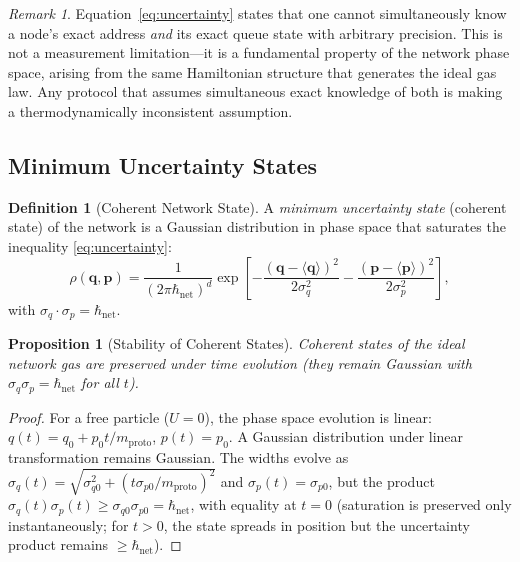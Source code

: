 \documentclass[11pt,twocolumn,a4paper]{article}
\newtheorem{proposition}[theorem]{Proposition}
\theoremstyle{definition}
\newtheorem{definition}[theorem]{Definition}
\theoremstyle{remark}
\newtheorem{remark}[theorem]{Remark}
\newcommand{\mpr}{m_{\mathrm{proto}}}
\newcommand{\hnet}{\hbar_{\mathrm{net}}}
\newcommand{\avg}[1]{\langle #1 \rangle}
\begin{document}
\begin{remark}
Equation~\eqref{eq:uncertainty} states that one cannot simultaneously know a
node's exact address \emph{and} its exact queue state with arbitrary precision.
This is not a measurement limitation---it is a fundamental property of the
network phase space, arising from the same Hamiltonian structure that
generates the ideal gas law.  Any protocol that assumes simultaneous exact
knowledge of both is making a thermodynamically inconsistent assumption.
\end{remark}

\subsection{Minimum Uncertainty States}\label{sec:min_uncertainty}

\begin{definition}[Coherent Network State]\label{def:coherent}
A \emph{minimum uncertainty state} (coherent state) of the network is a
Gaussian distribution in phase space that saturates the inequality
\eqref{eq:uncertainty}:
\begin{equation}\label{eq:coherent}
  \rho(\bm{q},\bm{p}) = \frac{1}{(2\pi\hnet)^d}
  \exp\!\left[-\frac{(\bm{q}-\avg{\bm{q}})^2}{2\sigma_q^2}
  -\frac{(\bm{p}-\avg{\bm{p}})^2}{2\sigma_p^2}\right],
\end{equation}
with $\sigma_q\cdot\sigma_p=\hnet$.
\end{definition}

\begin{proposition}[Stability of Coherent States]\label{prop:coherent}
Coherent states of the ideal network gas are preserved under time evolution
(they remain Gaussian with $\sigma_q\sigma_p=\hnet$ for all $t$).
\end{proposition}

\begin{proof}
For a free particle ($U=0$), the phase space evolution is linear:
$q(t)=q_0+p_0 t/\mpr$, $p(t)=p_0$.  A Gaussian distribution under linear
transformation remains Gaussian.  The widths evolve as
$\sigma_q(t)=\sqrt{\sigma_{q0}^2+(t\sigma_{p0}/\mpr)^2}$ and
$\sigma_p(t)=\sigma_{p0}$, but the product
$\sigma_q(t)\sigma_p(t)\geq\sigma_{q0}\sigma_{p0}=\hnet$, with equality
at $t=0$ (saturation is preserved only instantaneously; for $t>0$, the
state spreads in position but the uncertainty product remains
$\geq\hnet$).
\end{proof}

\end{document}
